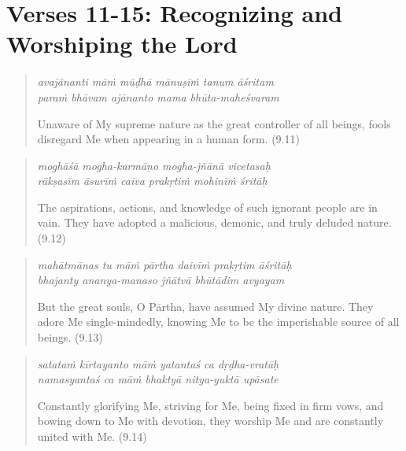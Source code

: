 \documentclass[12pt, twoside, openright]{memoir}
\begin{document}
\newpage

\section{Verses 11-15: Recognizing and Worshiping the Lord}\label{sec-verses-11-15-recognizing-and-worshiping-the-lord}


\par
\begin{verse}
\textit{avajānanti māṁ mūḍhā mānuṣīṁ tanum āśritam} \\
\textit{paraṁ bhāvam ajānanto mama bhūta-maheśvaram}

\noindent Unaware of My supreme nature as the great controller of all beings, fools disregard Me when appearing in a human form. (9.11)
\end{verse}
\par



\par
\begin{verse}
\textit{moghāśā mogha-karmāṇo mogha-jñānā vicetasaḥ} \\
\textit{rākṣasīm āsurīṁ caiva prakṛtiṁ mohinīṁ śritāḥ}

\noindent The aspirations, actions, and knowledge of such ignorant people are in vain. They have adopted a malicious, demonic, and truly deluded nature. (9.12)
\end{verse}
\par



\par
\begin{verse}
\textit{mahātmānas tu māṁ pārtha daivīṁ prakṛtim āśritāḥ} \\
\textit{bhajanty ananya-manaso jñātvā bhūtādim avyayam}

\noindent But the great souls, O Pārtha, have assumed My divine nature. They adore Me single-mindedly, knowing Me to be the imperishable source of all beings. (9.13)
\end{verse}
\par



\par
\begin{verse}
\textit{satataṁ kīrtayanto māṁ yatantaś ca dṛḍha-vratāḥ} \\
\textit{namasyantaś ca māṁ bhaktyā nitya-yuktā upāsate}

\noindent Constantly glorifying Me, striving for Me, being fixed in firm vows, and bowing down to Me with devotion, they worship Me and are constantly united with Me. (9.14)
\end{verse}
\par
\end{document}
